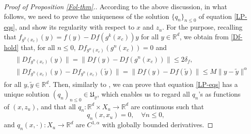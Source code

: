 \documentclass[reqno]{amsart}
\numberwithin{equation}{section}
\begin{document}
\begin{proof}[Proof of Proposition {\rm \ref{Fol-thm}.}]
According to the above discussion, in what follows, we need to prove the uniqueness of the solution $\{q_n\}_{n\le 0}$ of equation \eqref{LP-eqs}, and show its regularity with respect to $x$ and $z_u$. For the purpose, recalling that $f_{g^k(x_c)}(y)=f(y)-Df(g^k(x_c))y$ for all $y\in\mathbb{R}^d$, we obtain from
\eqref{Df-hold} that, for all  $n\le 0$,  $Df_{g^n(x_c)}(g^n(x_c))=0$ and
\begin{align}\label{Df-hold2}
\begin{split}
&   \|Df_{g^n(x_c)}(y)\|=\|Df(y)-Df(g^n(x_c))\|\le 2\delta_f,
\\
&\|Df_{g^n(x_c)}(y)-Df_{g^n(x_c)}(\tilde{y})\|=\|Df(y)-Df(\tilde{y})\|\le M\|y-\tilde{y}\|^\alpha
\end{split}
\end{align}
for all $y,\tilde{y}\in \mathbb{R}^d$.
Then, similarly to \cite[Theorems 2.1 and 2.2]{CHT-JDE}, we can prove that
equation \eqref{LP-eqs} has a unique solution $(q_n)_{n\le 0}\in \mathfrak{U}_{\varrho}$, which enables us to regard all $q_n$'s as functions of $(x,z_u)$, and that all $q_n: \mathbb{R}^d\times X_u \to \mathbb{R}^d$ are continuous such that
$$
q_n(x, x_u)=0, \quad \forall n\le 0,
$$
 and $q_n(x,\cdot):X_u \to \mathbb{R}^d$ are $C^{1,\alpha}$ with globally bounded derivatives.


\end{proof}
\end{document}
